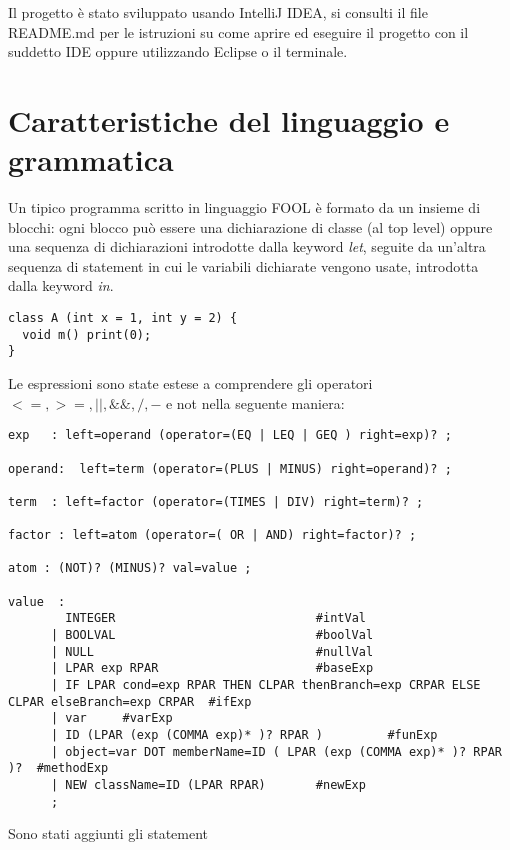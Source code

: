 \documentclass[a4paper]{article}   %
\begin{document}
Il progetto è stato sviluppato usando IntelliJ IDEA, si consulti il file README.md per le istruzioni
su come aprire ed eseguire il progetto con il suddetto IDE oppure utilizzando Eclipse o il terminale.

\section{Caratteristiche del linguaggio e grammatica}

Un tipico programma scritto in linguaggio FOOL è formato da un insieme di blocchi: ogni blocco può essere una dichiarazione di classe (al top level)
oppure una sequenza di dichiarazioni introdotte dalla keyword \textit{let}, seguite da un'altra sequenza di statement in cui le variabili dichiarate vengono usate, introdotta
dalla keyword \textit{in}.\\


\begin{lstlisting}
class A (int x = 1, int y = 2) {
  void m() print(0);
}
\end{lstlisting}

Le espressioni sono state estese a comprendere gli operatori $<=, >=, ||, \&\&, /, - $
   e not nella seguente maniera:\\

\begin{lstlisting}
exp   : left=operand (operator=(EQ | LEQ | GEQ ) right=exp)? ;

operand:  left=term (operator=(PLUS | MINUS) right=operand)? ;

term  : left=factor (operator=(TIMES | DIV) right=term)? ;

factor : left=atom (operator=( OR | AND) right=factor)? ;

atom : (NOT)? (MINUS)? val=value ;

value  :
        INTEGER                            #intVal
      | BOOLVAL                            #boolVal
      | NULL                               #nullVal
      | LPAR exp RPAR                      #baseExp
      | IF LPAR cond=exp RPAR THEN CLPAR thenBranch=exp CRPAR ELSE CLPAR elseBranch=exp CRPAR  #ifExp
      | var     #varExp
      | ID (LPAR (exp (COMMA exp)* )? RPAR )         #funExp
      | object=var DOT memberName=ID ( LPAR (exp (COMMA exp)* )? RPAR )?  #methodExp
      | NEW className=ID (LPAR RPAR)       #newExp
      ;

\end{lstlisting}

Sono stati aggiunti gli statement\\
\end{document}
